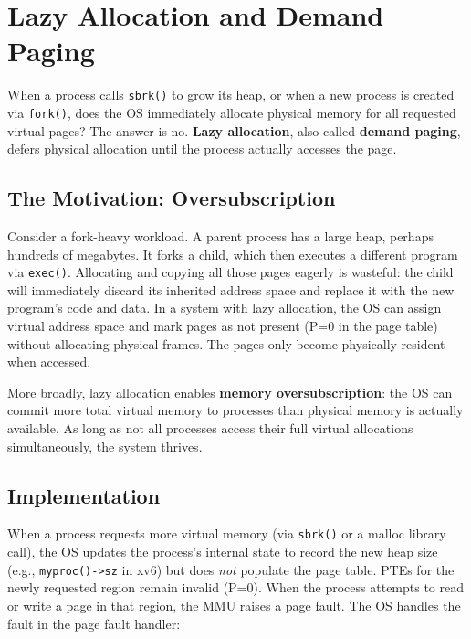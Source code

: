 \documentclass[11pt]{article}
\begin{document}
\section{Lazy Allocation and Demand Paging}

When a process calls \texttt{sbrk()} to grow its heap, or when a new process is created via \texttt{fork()}, does the OS immediately allocate physical memory for all requested virtual pages? The answer is no. \textbf{Lazy allocation}, also called \textbf{demand paging}, defers physical allocation until the process actually accesses the page.

\subsection{The Motivation: Oversubscription}

Consider a fork-heavy workload. A parent process has a large heap, perhaps hundreds of megabytes. It forks a child, which then executes a different program via \texttt{exec()}. Allocating and copying all those pages eagerly is wasteful: the child will immediately discard its inherited address space and replace it with the new program's code and data. In a system with lazy allocation, the OS can assign virtual address space and mark pages as not present (P=0 in the page table) without allocating physical frames. The pages only become physically resident when accessed.

More broadly, lazy allocation enables \textbf{memory oversubscription}: the OS can commit more total virtual memory to processes than physical memory is actually available. As long as not all processes access their full virtual allocations simultaneously, the system thrives.

\subsection{Implementation}

When a process requests more virtual memory (via \texttt{sbrk()} or a malloc library call), the OS updates the process's internal state to record the new heap size (e.g., \texttt{myproc()->sz} in xv6) but does \emph{not} populate the page table. PTEs for the newly requested region remain invalid (P=0). When the process attempts to read or write a page in that region, the MMU raises a page fault. The OS handles the fault in the page fault handler:
\end{document}
